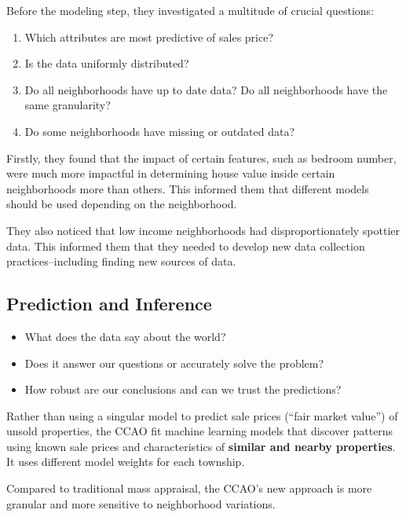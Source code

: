 \documentclass[
  letterpaper,
  DIV=11,
  numbers=noendperiod]{scrreprt}
\providecommand{\tightlist}{%
  \setlength{\itemsep}{0pt}\setlength{\parskip}{0pt}}\usepackage{longtable,booktabs,array}
\begin{document}
Before the modeling step, they investigated a multitude of crucial
questions:

\begin{enumerate}
\def\labelenumi{\arabic{enumi}.}
\tightlist
\item
  Which attributes are most predictive of sales price?
\item
  Is the data uniformly distributed?
\item
  Do all neighborhoods have up to date data? Do all neighborhoods have
  the same granularity?\\
\item
  Do some neighborhoods have missing or outdated data?
\end{enumerate}

Firstly, they found that the impact of certain features, such as bedroom
number, were much more impactful in determining house value inside
certain neighborhoods more than others. This informed them that
different models should be used depending on the neighborhood.

They also noticed that low income neighborhoods had disproportionately
spottier data. This informed them that they needed to develop new data
collection practices--including finding new sources of data.

\hypertarget{prediction-and-inference-1}{%
\subsection{Prediction and Inference}\label{prediction-and-inference-1}}

\begin{itemize}
\tightlist
\item
  What does the data say about the world?
\item
  Does it answer our questions or accurately solve the problem?
\item
  How robust are our conclusions and can we trust the predictions?
\end{itemize}

Rather than using a singular model to predict sale prices (``fair market
value'') of unsold properties, the CCAO fit machine learning models that
discover patterns using known sale prices and characteristics of
\textbf{similar and nearby properties}. It uses different model weights
for each township.

Compared to traditional mass appraisal, the CCAO's new approach is more
granular and more sensitive to neighborhood variations.
\end{document}
